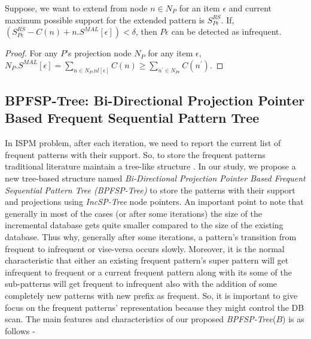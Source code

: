 \begin{lem} \label{lemma:loop_reduction}
Suppose, we want to extend from node $n \in N_{P}$ for an item $\epsilon$ and current maximum possible support for the extended pattern is $S_{P\epsilon}^{RS}$. If, $(S_{P\epsilon}^{RS}-C(n)+n.S^{MAL}[\epsilon]) < \delta$, then $P\epsilon$ can be detected as infrequent.
\end{lem}
\begin{proof}
    For any $P$'s projection node $N_{P}$ for any item $\epsilon$, $N_{P}.S^{MAL}[\epsilon] = \sum_{n \in N_{P}.nl[\epsilon]}C(n) \geq \sum_{n^{\prime} \in N_{P\epsilon}} C(n^{\prime})$.
\end{proof}






\subsection{BPFSP-Tree: Bi-Directional Projection Pointer Based Frequent Sequential Pattern Tree}
In ISPM problem, after each iteration, we need to report the current list of frequent patterns with their support. So, to store the frequent patterns traditional literature maintain a tree-like structure \cite{chen2007incremental,liu2012incremental}. In our study, we propose a new tree-based structure named \textit{Bi-Directional Projection Pointer Based Frequent Sequential Pattern Tree (BPFSP-Tree)} to store the patterns with their support and projections using \textit{IncSP-Tree} node pointers. An important point to note that generally in most of the cases (or after some iterations) the size of the incremental database gets quite smaller compared to the size of the existing database. Thus why, generally after some iterations, a pattern's transition from frequent to infrequent or vise-versa occurs slowly. Moreover, it is the normal characteristic that either an existing frequent pattern's super pattern will get infrequent to frequent or a current frequent pattern along with its some of the sub-patterns will get frequent to infrequent also with the addition of some completely new patterns with new prefix as frequent. So, it is important to give focus on the frequent patterns' representation because they might control the DB scan. The main features and characteristics of our proposed \textit{BPFSP-Tree}($B$) is as follows -
